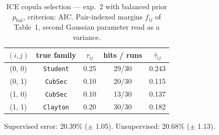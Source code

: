 \begin{table}[htbp]
  \centering
  \caption{ICE copula selection — exp.\ 2 with balanced prior $p_{\text{bal}}$, criterion: AIC. Pair-indexed margins $f_{ij}$ of Table~1, second Gaussian parameter read as a variance.}
  \label{tab:exp3-exp2_bal_p__aic}
  \begin{tabular}{ccccc}
    \toprule
    $(i, j)$ & true family & $\tau_{ij}$ & hits / runs & $\hat\tau_{ij}$ \\
    \midrule
    (0, 0) & \texttt{Student} & 0.25 & 29/30 & 0.243 \\
    (0, 1) & \texttt{CubSec} & 0.10 & 20/30 & 0.115 \\
    (1, 0) & \texttt{CubSec} & 0.10 & 13/30 & 0.137 \\
    (1, 1) & \texttt{Clayton} & 0.20 & 30/30 & 0.182 \\
    \bottomrule
  \end{tabular}
  \par\smallskip Supervised error: 20.39\% ($\pm$ 1.05). Unsupervised: 20.68\% ($\pm$ 1.13).
\end{table}
